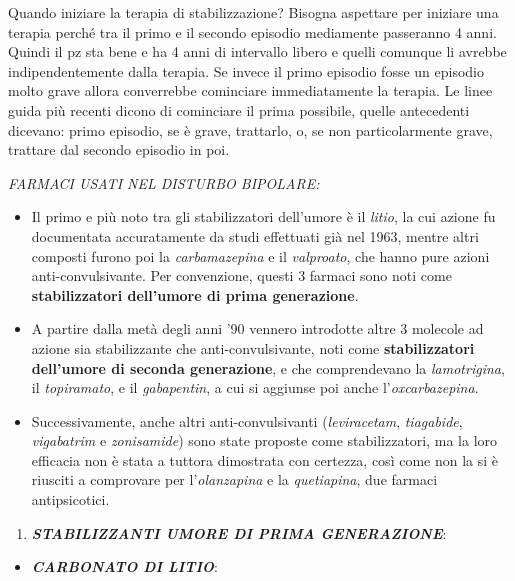 \documentclass[]{article}
\begin{document}
Quando iniziare la terapia di stabilizzazione? Bisogna aspettare per
iniziare una terapia perché tra il primo e il secondo episodio
mediamente passeranno 4 anni. Quindi il pz sta bene e ha 4 anni di
intervallo libero e quelli comunque li avrebbe indipendentemente dalla
terapia. Se invece il primo episodio fosse un episodio molto grave
allora converrebbe cominciare immediatamente la terapia. Le linee guida
più recenti dicono di cominciare il prima possibile, quelle antecedenti
dicevano: primo episodio, se è grave, trattarlo, o, se non
particolarmente grave, trattare dal secondo episodio in poi.

\emph{FARMACI USATI NEL DISTURBO BIPOLARE:}

\begin{itemize}
\item
  Il primo e più noto tra gli stabilizzatori dell'umore è il
  \emph{litio}, la cui azione fu documentata accuratamente da studi
  effettuati già nel 1963, mentre altri composti furono poi la
  \emph{carbamazepina} e il \emph{valproato}, che hanno pure azioni
  anti-convulsivante. Per convenzione, questi 3 farmaci sono noti come
  \textbf{stabilizzatori dell'umore di prima generazione}.
\item
  A partire dalla metà degli anni '90 vennero introdotte altre 3
  molecole ad azione sia stabilizzante che anti-convulsivante, noti come
  \textbf{stabilizzatori dell'umore di seconda generazione}, e che
  comprendevano la \emph{lamotrigina}, il \emph{topiramato}, e il
  \emph{gabapentin}, a cui si aggiunse poi anche l'\emph{oxcarbazepina}.
\item
  Successivamente, anche altri anti-convulsivanti (\emph{leviracetam},
  \emph{tiagabide}, \emph{vigabatrim} e \emph{zonisamide}) sono state
  proposte come stabilizzatori, ma la loro efficacia non è stata a
  tuttora dimostrata con certezza, così come non la si è riusciti a
  comprovare per l'\emph{olanzapina} e la \emph{quetiapina}, due farmaci
  antipsicotici.
\end{itemize}

\begin{enumerate}
\def\labelenumi{\arabic{enumi}.}
\item
  \textbf{\emph{STABILIZZANTI UMORE DI PRIMA GENERAZIONE}}:
\end{enumerate}

\begin{itemize}
\item
  \textbf{\emph{CARBONATO DI LITIO}}:
\end{itemize}
\end{document}
